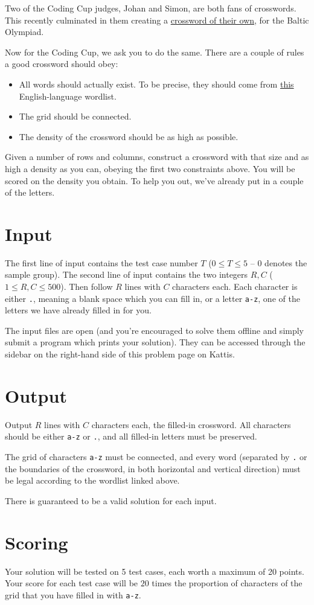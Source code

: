 Two of the Coding Cup judges, Johan and Simon, are both fans of crosswords.
This recently culminated in them creating a \href{http://boi2018.progolymp.se/day4.pdf}{crossword of their own},
for the Baltic Olympiad.

Now for the Coding Cup, we ask you to do the same. There are a couple of rules a good crossword should obey:
\begin{itemize}
  \item All words should actually exist. To be precise, they should come from \href{http://codingcup.se/2018/wordlist.txt}{this} English-language wordlist.
  \item The grid should be connected.
  \item The density of the crossword should be as high as possible.
\end{itemize}

Given a number of rows and columns, construct a crossword with that size and as high a
density as you can, obeying the first two constraints above.
You will be scored on the density you obtain.
To help you out, we've already put in a couple of the letters.

\section*{Input}
The first line of input contains the test case number $T$ ($0 \le T \le 5$ -- $0$ denotes the sample group).
The second line of input contains the two integers $R, C$ ($1 \le R, C \le 500$).
Then follow $R$ lines with $C$ characters each. Each character is either \texttt{.},
meaning a blank space which you can fill in, or a letter \texttt{a-z}, one of the
letters we have already filled in for you.

The input files are open (and you're encouraged to solve them offline and simply
submit a program which prints your solution). They can be accessed through the
sidebar on the right-hand side of this problem page on Kattis.

\section*{Output}
Output $R$ lines with $C$ characters each, the filled-in crossword.
All characters should be either \texttt{a-z} or \texttt{.}, and all filled-in
letters must be preserved.

The grid of characters \texttt{a-z} must be connected, and every word
(separated by \texttt{.} or the boundaries of the crossword, in both
horizontal and vertical direction) must be legal according to the wordlist
linked above.

There is guaranteed to be a valid solution for each input.

\section*{Scoring}
Your solution will be tested on 5 test cases, each worth a maximum of 20 points.
Your score for each test case will be $20$ times the proportion of characters
of the grid that you have filled in with \texttt{a-z}.
